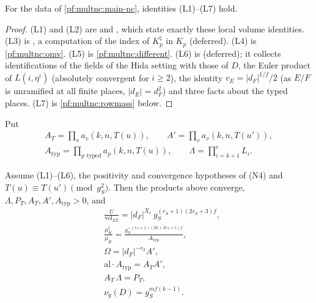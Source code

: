 \begin{lemma}\label{pf:multnc:localids-hold}
For the data of \cref{pf:multnc:main-nc}, identities (L1)--(L7) hold.
\end{lemma}

\begin{proof}
(L1) and (L2) are  and ,
which state exactly these local volume identities. (L3) is , a
computation of the index of $K^\natural_p$ in $K_p$ (deferred). (L4) is \cref{pf:multnc:omv}. (L5) is
\cref{pf:multnc:different}. (L6) is 
(deferred); it collects identifications of the fields of the Hida setting with those of $D$, the Euler product of
$L(i,\eta^i)$ (absolutely convergent for $i\ge2$), the identity $v_E=|d_F|^{1/f}/2$ (as $E/F$ is unramified at all finite
places, $|d_E|=d_F^2$) and three facts about the typed places. (L7) is \cref{pf:multnc:rowmass} below.
\end{proof}

Put
\begin{gather*}
A_T=\prod_va_v(k,n,T(u)),\qquad A'=\prod_va_v(k,n,T(u')),\\
A_{\mathrm{typ}}=\prod_{p\text{ typed}}a_p(k,n,T(u)),\qquad\Lambda=\prod_{i=k+1}^{r}L_i .
\end{gather*}

\begin{proposition}\label{pf:multnc:global}
Assume (L1)--(L6), the positivity and convergence hypotheses of (N4) and $T(u)\equiv T(u')\pmod{g_S^2}$. Then the products
above converge, $\Lambda,P_T,A_T,A',A_{\mathrm{typ}}>0$, and
\begin{align}
&\frac{U}{\mathrm{vol}_{ZZ}}=|d_F|^{X_e}\,g_S^{(r_S+1)(2r_S+3)f},\label{pf:multnc:eq-G1}\\
&\frac{\mu^\natural_K}{\mu_K}=\frac{g_S^{-(r_S+1)(2k+2r_S+1)f}}{A_{\mathrm{typ}}},\label{pf:multnc:eq-G2}\\
&\Omega=|d_F|^{-e_2}A',\label{pf:multnc:eq-G3}\\
&\mathrm{al}\cdot A_{\mathrm{typ}}=A_TA',\label{pf:multnc:eq-G4}\\
&A_T\,\Lambda=P_T,\label{pf:multnc:eq-G5}\\
&\nu_g(D)=g_S^{mf(k-1)}.\label{pf:multnc:eq-G6}
\end{align}
\end{proposition}


